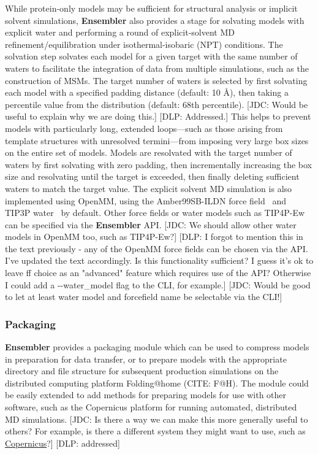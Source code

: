 \documentclass[aps,pre,twocolumn,nofootinbib,superscriptaddress,linenumbers]{revtex4-1}
\begin{document}
While protein-only models may be sufficient for structural analysis or implicit solvent simulations, {\bf Ensembler} also provides a stage for solvating models with explicit water and performing a round of explicit-solvent MD refinement/equilibration under isothermal-isobaric (NPT) conditions.
The solvation step solvates each model for a given target with the same number of waters to facilitate the integration of data from multiple simulations, such as the construction of MSMs.
The target number of waters is selected by first solvating each model with a specified padding distance (default: 10 \AA), then taking a percentile value from the distribution (default: 68th percentile).
{\color{red}[JDC: Would be useful to explain why we are doing this.]}
{\color{blue}[DLP: Addressed.]}
This helps to prevent models with particularly long, extended loops---such as those arising from template structures with unresolved termini---from imposing very large box sizes on the entire set of models.
Models are resolvated with the target number of waters by first solvating with zero padding, then incrementally increasing the box size and resolvating until the target is exceeded, then finally deleting sufficient waters to match the target value.
The explicit solvent MD simulation is also implemented using OpenMM, using the Amber99SB-ILDN force field~\cite{amber99sb-ildn} and TIP3P water~\cite{tip3p} by default.
Other force fields or water models such as TIP4P-Ew~\cite{tip4p-ew} can be specified via the {\bf Ensembler} API.
{\color{red}[JDC: We should allow other water models in OpenMM too, such as TIP4P-Ew?]}
{\color{blue}[DLP: I forgot to mention this in the text previously - any of the OpenMM force fields can be chosen via the API. I've updated the text accordingly. Is this functionality sufficient? I guess it's ok to leave ff choice as an "advanced" feature which requires use of the API? Otherwise I could add a -{}-water\_model flag to the CLI, for example.]}
{\color{red}[JDC: Would be good to let at least water model and forcefield name be selectable via the CLI!]}

\subsubsection*{Packaging}

{\bf Ensembler} provides a packaging module which can be used to compress models in preparation for data transfer, or to prepare models with the appropriate directory and file structure for subsequent production simulations on the distributed computing platform Folding@home (CITE: F@H).
The module could be easily extended to add methods for preparing models for use with other software, such as the Copernicus platform for running automated, distributed MD simulations.
{\color{red}[JDC: Is there a way we can make this more generally useful to others?  For example, is there a different system they might want to use, such as \href{http://copernicus.readthedocs.org/en/latest/tutorials/md-tutorial.html#creating-a-workflow-for-molecular-simulations}{Copernicus}?]}
{\color{blue}[DLP: addressed]}
\end{document}
